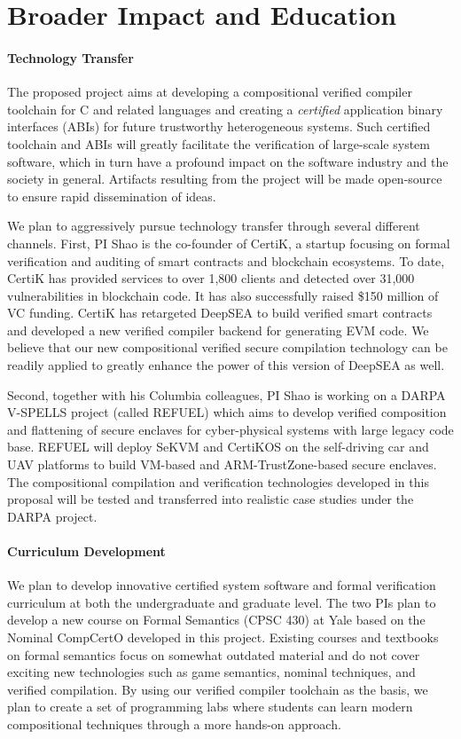 \section{Broader Impact and Education}
\label{sec:impact}

\paragraph*{Technology Transfer}
The proposed project aims at developing a compositional verified
compiler toolchain for C and related languages and creating a {\em
  certified} application binary interfaces (ABIs) for future
trustworthy heterogeneous systems. Such certified toolchain and ABIs
will greatly facilitate the verification of large-scale system
software, which in turn have a profound impact on the software
industry and the society in general.
Artifacts resulting from the project will be
made open-source to ensure rapid dissemination of ideas.

We plan to aggressively pursue technology transfer through several
different channels. First, PI Shao is the co-founder of CertiK,
a startup focusing on formal verification and auditing of smart
contracts and blockchain ecosystems. To date,
CertiK has provided services to over 1,800 clients and detected
over 31,000 vulnerabilities in blockchain code. It has also
successfully raised \$150 million of VC funding. CertiK has retargeted
DeepSEA to build verified smart contracts and developed a new
verified compiler backend for generating EVM code. We believe
that our new compositional verified secure compilation technology
can be readily applied to greatly enhance the power of this version
of DeepSEA as well.

Second, together with his Columbia colleagues, PI Shao is working on
a DARPA V-SPELLS project (called REFUEL)
which aims to develop verified composition and flattening of secure
enclaves for cyber-physical systems with large legacy code base.
REFUEL will deploy SeKVM and CertiKOS on the self-driving car
and UAV platforms to build VM-based and ARM-TrustZone-based secure
enclaves. The compositional compilation and verification technologies
developed in this proposal will be tested and transferred into realistic
case studies under the DARPA project.

\vspace*{-2ex}
\paragraph*{Curriculum Development}
We plan to develop innovative certified system software and formal
verification curriculum at both the undergraduate and graduate
level. The two PIs plan to develop a new course on Formal Semantics
(CPSC 430) at Yale based on the Nominal CompCertO developed in this
project. Existing courses and textbooks on formal semantics focus on
somewhat outdated material and do not cover exciting new technologies
such as game semantics, nominal techniques, and verified
compilation. By using our verified compiler toolchain as the basis, we
plan to create a set of programming labs where students can learn
modern compositional techniques through a more hands-on approach.

